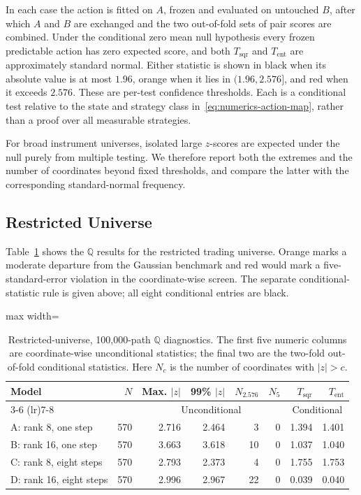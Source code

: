 \documentclass[11pt]{article}
\newcommand{\Q}{\mathbb Q}
\newcommand{\abs}[1]{\lvert #1\rvert}
\theoremstyle{plain}
\theoremstyle{definition}
\theoremstyle{remark}
\begin{document}
In each case the action is fitted on $A$, frozen and evaluated on untouched
$B$, after which $A$ and $B$ are exchanged and the two out-of-fold sets of
pair scores are combined.  Under the conditional zero mean null hypothesis
every frozen predictable action has zero expected score, and both
$T_{\mathrm{sqr}}$ and $T_{\mathrm{ent}}$ are approximately standard normal.
Either statistic is shown in black when its absolute value is at most $1.96$,
orange when it lies in $(1.96,2.576]$, and red when it exceeds $2.576$.
These are per-test confidence thresholds.  Each is a conditional test relative
to the state and strategy class in~\eqref{eq:numerics-action-map}, rather than
a proof over all measurable strategies.

For broad instrument universes, isolated large $z$-scores are expected under
the null purely from multiple testing.  We therefore report both the extremes
and the number of coordinates beyond fixed thresholds, and compare the latter
with the corresponding standard-normal frequency.

\subsection{Restricted Universe}

Table~\ref{tab:numerics-restricted-q} shows the $\Q$ results for the restricted
trading universe.  Orange marks a moderate departure from the Gaussian
benchmark and red would mark a five-standard-error violation in the
coordinate-wise screen.  The separate conditional-statistic rule is given
above; all eight conditional entries are black.

\begin{table}[H]
\centering
\small
\begin{adjustbox}{max width=\textwidth}
\begin{tabular}{lrrrrrrr}
\toprule
Model & $N$ & Max. $\abs{z}$ & 99\% $\abs{z}$
& $N_{2.576}$ & $N_5$ & $T_{\mathrm{sqr}}$ & $T_{\mathrm{ent}}$\\
\cmidrule(lr){3-6}
\cmidrule(lr){7-8}
& & \multicolumn{4}{c}{Unconditional} & \multicolumn{2}{c}{Conditional}\\
\midrule
A: rank 8, one step    & 570 & 2.716 & 2.464 &  3 & 0 & 1.394 & 1.401\\
B: rank 16, one step   & 570 & {\color{orange}3.663} & {\color{orange}3.618}
& {\color{orange}10} & 0 & 1.037 & 1.040\\
C: rank 8, eight steps & 570 & 2.793 & 2.373 &  4 & 0 & 1.755 & 1.753\\
D: rank 16, eight steps& 570 & 2.996 & {\color{orange}2.967}
& {\color{orange}22} & 0 & 0.039 & 0.040\\
\bottomrule
\end{tabular}
\end{adjustbox}
\caption{Restricted-universe, 100,000-path $\Q$ diagnostics.  The first five
numeric columns are coordinate-wise unconditional statistics; the final two
are the two-fold out-of-fold conditional statistics.  Here $N_c$ is the number
of coordinates with $\abs{z}>c$.}
\label{tab:numerics-restricted-q}
\end{table}
\end{document}
